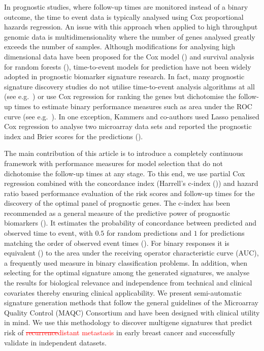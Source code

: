 \documentclass[letterpaper,12pt]{article}
\begin{document}
In prognostic studies, where follow-up times are monitored instead of a binary outcome, the time to event data is typically analysed using Cox proportional hazards regression. An issue with this approach when applied to high throughput genomic data is multidimensionality where the number of genes analysed greatly exceeds the number of samples. Although modifications for analysing high dimensional data have been proposed for the Cox model (\citet{Boulesteix:06, Li:04, Gui:05, Witten:10}) and survival analysis for random forests (\citet{Ishwaran:08}), time-to-event models for prediction have not been widely adopted in prognostic biomarker signature research. In fact, many prognostic signature discovery studies do not utilise time-to-event analysis algorithms at all (see e.g.\ \citet{Schmidt:08}) or use Cox regression for ranking the genes but dichotomise the follow-up times to estimate binary performance measures such as area under the ROC curve (see e.g.\ \citet{Wang:05}). In one exception, Kammers and co-authors used Lasso penalised Cox regression to analyse two microarray data sets and reported the prognostic index and Brier scores for the predictions (\citet{Kammers:11}). 

The main contribution of this article is to introduce a completely continuous framework with performance measures for model selection that do not dichotomise the follow-up times at any stage. To this end, we use partial Cox regression combined with the concordance index (Harrell's c-index (\citet{Harrell:10,Raykar:07})) and hazard ratio based performance evaluation of the risk scores and follow-up times for the discovery of the optimal panel of prognostic genes. The c-index has been recommended as a general measure of the predictive power of prognostic biomarkers (\citet{Newson:06}). It estimates the probability of concordance between predicted and observed time to event, with $0.5$ for random predictions and $1$ for predictions matching the order of observed event times (\citet{Harrell:10}). For binary responses it is equivalent (\citet{Newson:06}) to the area under the receiving operator characteristic curve (AUC), a frequently used measure in binary classification problems. In addition, when selecting for the optimal signature among the generated signatures, we analyse the results for biological relevance and independence from technical and clinical covariates thereby ensuring clinical applicability. We present semi-automatic signature generation methods that follow the general guidelines of the Microarray Quality Control (MAQC) Consortium and have been designed with clinical utility in mind. We use this methodology to discover multigene signatures that predict risk of \textcolor{red}{\sout{recurrence}distant metastasis} in early breast cancer and successfully validate in independent datasets.
\end{document}
